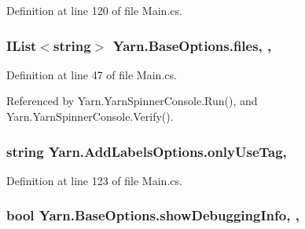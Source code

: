 Definition at line 120 of file Main.\-cs.

\hypertarget{a00035_aa93cbb1bc1d5328e0a417012621e92d2}{
\subsubsection[{files}]{\setlength{\rightskip}{0pt plus 5cm}I\-List$<$string$>$ Yarn.\-Base\-Options.\-files\hspace{0.3cm}{\ttfamily [get]}, {\ttfamily [set]}, {\ttfamily [inherited]}}}\label{a00035_aa93cbb1bc1d5328e0a417012621e92d2}


Definition at line 47 of file Main.\-cs.



Referenced by Yarn.\-Yarn\-Spinner\-Console.\-Run(), and Yarn.\-Yarn\-Spinner\-Console.\-Verify().

\hypertarget{a00031_ab6162338f9606a836f3101fe0e228249}{
\subsubsection[{only\-Use\-Tag}]{\setlength{\rightskip}{0pt plus 5cm}string Yarn.\-Add\-Labels\-Options.\-only\-Use\-Tag\hspace{0.3cm}{\ttfamily [get]}, {\ttfamily [set]}}}\label{a00031_ab6162338f9606a836f3101fe0e228249}


Definition at line 123 of file Main.\-cs.

\hypertarget{a00035_a89964ea17bd19caf00cb5bff563ed01c}{
\subsubsection[{show\-Debugging\-Info}]{\setlength{\rightskip}{0pt plus 5cm}bool Yarn.\-Base\-Options.\-show\-Debugging\-Info\hspace{0.3cm}{\ttfamily [get]}, {\ttfamily [set]}, {\ttfamily [inherited]}}}\label{a00035_a89964ea17bd19caf00cb5bff563ed01c}


